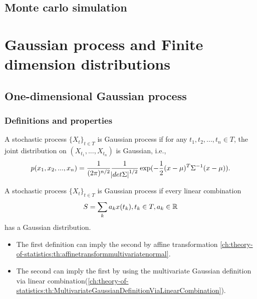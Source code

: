 \begin{refsection}
\begin{theorem}
	
\end{theorem}


\subsection{Monte carlo simulation}


\section{Gaussian process and Finite dimension distributions}
\subsection{One-dimensional Gaussian process}
\subsubsection{Definitions and properties}
\begin{definition}
	A stochastic process $\{X_t\}_{t\in T}$ is Gaussian process if for any $t_1,t_2,...,t_n\in T$, the joint distribution on $(X_{t_1},...,X_{t_n})$ is Gaussian, i.e., $$p(x_1,x_2,...,x_n)=\frac{1}{(2\pi)^{n/2}}\frac{1}{\abs{det \Sigma}^{1/2}}\exp(-\frac{1}{2}(x-\mu)^T\Sigma^{-1}(x-\mu)).$$
\end{definition}

\begin{definition}\cite[19]{lindgren2012stationary}
	A stochastic process $\{X_t\}_{t\in T}$ is Gaussian process if every linear combination $$S = \sum_k a_k x(t_k),t_k\in T, a_k\in \mathbb{R}$$
	has a Gaussian distribution. 	
\end{definition}


\begin{remark}\hfill
\begin{itemize}
	\item The first definition can imply the second by affine transformation \autoref{ch:theory-of-statistics:th:affinetransformmultivariatenormal}.
	\item The second can imply the first by using the multivariate Gaussian definition via linear combination(\autoref{ch:theory-of-statistics:th:MultivariateGaussianDefinitionViaLinearCombination}).
\end{itemize}	
\end{remark}


\end{refsection}
